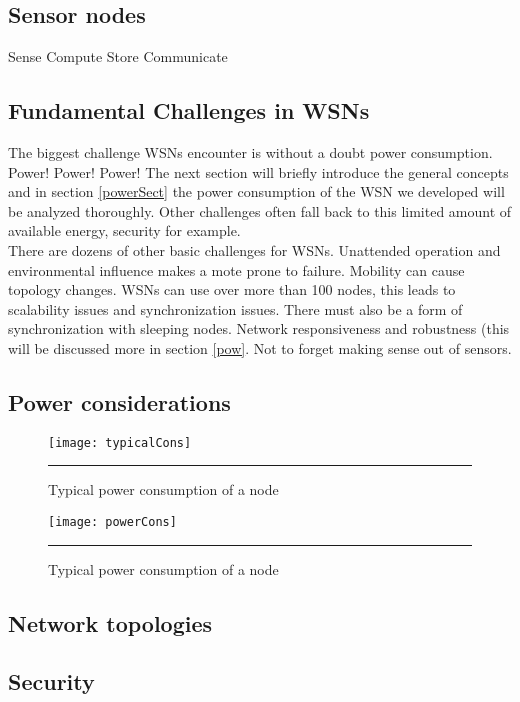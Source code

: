 \subsection{Sensor nodes}
Sense
Compute
Store
Communicate
\subsection{Fundamental Challenges in WSNs}
The biggest challenge WSNs encounter is without a doubt power consumption. Power! Power! Power! The next section will briefly introduce the general concepts and in section \ref{powerSect} the power consumption of the WSN we developed will be analyzed thoroughly. Other challenges often fall back to this limited amount of available energy, security for example.\\
There are dozens of other basic challenges for WSNs. Unattended operation and environmental influence makes a mote prone to failure. Mobility can cause topology changes. WSNs can use over more than 100 nodes, this leads to scalability issues and synchronization issues. There must also be a form of synchronization with sleeping nodes. Network responsiveness and robustness (this will be discussed more in section \ref{pow}.  Not to forget making sense out of sensors.\\
\subsection{Power considerations}
\begin{figure}[htbp]
\centering
\texttt{[image: typicalCons]}
\rule{30em}{0.5pt}
\caption{Typical power consumption of a node}
\label{fig:typicalCons}
\end{figure} 
\begin{figure}[htbp]
\centering
\texttt{[image: powerCons]}
\rule{30em}{0.5pt}
\caption{Typical power consumption of a node}
\label{fig:typicalCons}
\end{figure} 

\subsection{Network topologies}
\subsection{Security}

